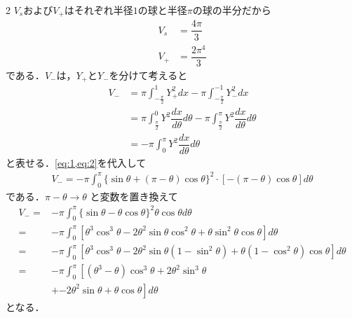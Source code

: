 \documentclass[../../main.tex]{subfiles}
\begin{document}
\begin{multicols}{2}
  $V_{s}$および$V_{+}$はそれぞれ半径$1$の球と半径$\pi$の球の半分だから
  \begin{align}
    V_{s} & = \dfrac{4\pi}{3} \label{eq:4}   \\
    V_{+} & = \dfrac{2\pi^4}{3} \label{eq:5}
  \end{align}
  である．$V_{-}$は，$Y_{+}$と$Y_{-}$を分けて考えると
  \begin{align}
    V_{-}
    & = \pi \int_{-\frac{\pi}{2}}^{1} Y_{+}^2 dx - \pi \int_{-\frac{\pi}{2}}^{-1} Y_{-}^2 dx                                      \nonumber   \\
    & = \pi \int_{\frac{\pi}{2}}^{0} Y^2 \dfrac{dx}{d\theta} d\theta - \pi \int_{\frac{\pi}{2}}^{\pi} Y^2 \dfrac{dx}{d\theta} d\theta \nonumber \\
    & = -\pi \int_{0}^{\pi} Y^2 \dfrac{dx}{d\theta} d\theta \label{eq:6}
  \end{align}
  と表せる．\cref{eq:1,eq:2}を代入して
  \begin{align}
    V_{-} =  -\pi \int_{0}^{\pi} \{ \sin\theta + (\pi - \theta) \cos\theta \}^2 \cdot \left[-(\pi - \theta)\cos\theta\right] d\theta
  \end{align}
  である．$\pi - \theta \to \theta$ と変数を置き換えて
  \begin{align}
    V_{-}
    = & -\pi \int_{0}^{\pi} \{ \sin\theta - \theta\cos\theta \}^2 \theta \cos\theta  d\theta                                                      \\
    = & -\pi \int_{0}^{\pi} \left[\theta^3\cos^3\theta -2 \theta^2\sin\theta\cos^2\theta + \theta \sin^2\theta\cos\theta \right]  d\theta         \\
    = & -\pi \int_{0}^{\pi} \left[\theta^3\cos^3\theta -2 \theta^2\sin\theta(1-\sin^2\theta) + \theta (1-\cos^2\theta)\cos\theta \right]  d\theta \\
    = & -\pi \int_{0}^{\pi} \left[\left(\theta^3-\theta\right)\cos^3\theta + 2\theta^2\sin^3\theta \right.                                        \\
    & + \left.-2 \theta^2\sin\theta + \theta \cos\theta \right]  d\theta
  \end{align}
  となる．


\end{multicols}
\end{document}
